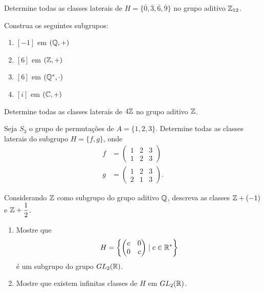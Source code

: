 \documentclass[12pt]{exam}
\begin{document}
    \vspace{.3cm}

    \questao{} Determine todas as classes laterais de $H = \{\overline{0}, \overline{3}, \overline{6}, \overline{9}\}$ no grupo aditivo $\mathbb{Z}_{12}$.

    \vspace{.3cm}

    \questao{} Construa os seguintes subgrupos:
    \begin{enumerate}[label={\alph*})]
        \item $[-1]$ em $(\mathbb{Q}, +)$

        \item $[6]$ em $(\mathbb{Z}, +)$

        \item $[6]$ em $(\mathbb{Q}^*, \cdot)$

        \item $[i]$ em $(\mathbb{C}, +)$
    \end{enumerate}

    \vspace{.3cm}

    \questao{} Determine todas as classes laterais de $4\mathbb{Z}$ no grupo aditivo $\mathbb{Z}$.

    \vspace{.3cm}

    \questao{} Seja $S_3$ o grupo de permuta\c{c}\~oes de $A = \{1, 2, 3\}$. Determine todas as classes laterais do subgrupo $H = \{f, g\}$, onde
    \begin{align*}
        f &= \begin{pmatrix}
            1 & 2 & 3\\
            1 & 2 & 3
        \end{pmatrix}\\
        g &= \begin{pmatrix}
            1 & 2 & 3\\
            2 & 1 & 3
        \end{pmatrix}.
    \end{align*}

    \vspace{.3cm}

    \questao{} Considerando $\mathbb{Z}$ como subgrupo do grupo aditivo $\mathbb{Q}$, descreva as classes $\mathbb{Z} + (-1)$ e $\mathbb{Z} + \dfrac{1}{2}$.

    \vspace{.3cm}

    \questao{} \begin{enumerate}[label={\alph*})]
        \item Mostre que
        \[
            H = \left\{\begin{pmatrix}
                c & 0\\
                0 & c
            \end{pmatrix} \mid c \in \mathbb{R}^*\right\}
        \]
        \'e um subgrupo do grupo $GL_2(\mathbb{R})$.

        \item Mostre que existem infinitas classes de $H$ em $GL_2(\mathbb{R})$.
    \end{enumerate}
\end{document}
